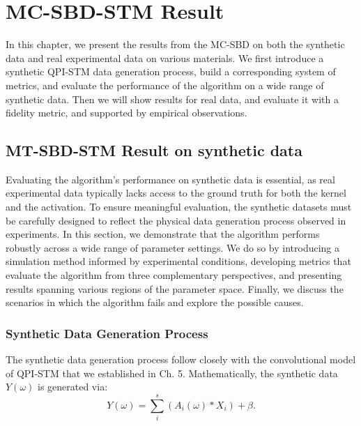 \chapter{MC-SBD-STM Result}
In this chapter, we present the results from the \ac{MC-SBD} on both the synthetic data and real experimental data on various materials. We first introduce a synthetic QPI-STM data generation process, build a corresponding system of metrics, and evaluate the performance of the algorithm on a wide range of synthetic data. Then we will show results for real data, and evaluate it with a fidelity metric, and supported by empirical observations. 

\section{MT-SBD-STM Result on synthetic data}
Evaluating the algorithm's performance on synthetic data is essential, as real experimental data typically lacks access to the ground truth for both the kernel and the activation. To ensure meaningful evaluation, the synthetic datasets must be carefully designed to reflect the physical data generation process observed in experiments. In this section, we demonstrate that the algorithm performs robustly across a wide range of parameter settings. We do so by introducing a simulation method informed by experimental conditions, developing metrics that evaluate the algorithm from three complementary perspectives, and presenting results spanning various regions of the parameter space. Finally, we discuss the scenarios in which the algorithm fails and explore the possible causes.

\subsection{Synthetic Data Generation Process}
The synthetic data generation process follow closely with the convolutional model of QPI-STM that we established in Ch. 5. Mathematically, the synthetic data $Y(\omega)$ is generated via:
\begin{equation}
	Y(\omega) = \sum_i^s ( A_i(\omega) * X_i) + \beta. 
\end{equation} 



